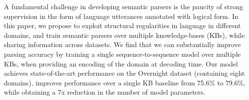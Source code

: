 A fundamental challenge in developing semantic parsers is the paucity of strong supervision in the form of language utterances annotated with logical form. In this paper, we propose to exploit structural regularities in language in different domains, and train semantic parsers over multiple knowledge-bases (KBs), while sharing information across datasets. We find that we can substantially improve parsing accuracy by training a single sequence-to-sequence model over multiple KBs, when providing an encoding of the domain at decoding time. Our model achieves state-of-the-art performance on the Overnight dataset (containing eight domains), improves performance over a single KB baseline from 75.6\% to 79.6\%, while obtaining a 7x reduction in the number of model parameters.
